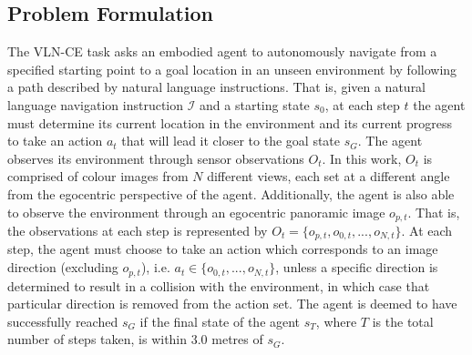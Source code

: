 \documentclass{svproc}
\begin{document}
\subsection{Problem Formulation}
    The VLN-CE task asks an embodied agent to autonomously navigate from a specified starting point to a goal location in an unseen environment by following a path described by natural language instructions. That is, given a natural language navigation instruction $\mathcal{I}$ and a starting state $s_0$, at each step $t$ the agent must determine its current location in the environment and its current progress to take an action $a_t$ that will lead it closer to the goal state $s_G$. The agent observes its environment through sensor observations $O_t$. In this work, $O_t$ is comprised of colour images from $N$ different views, each set at a different angle from the egocentric perspective of the agent. Additionally, the agent is also able to observe the environment through an egocentric panoramic image $o_{p,t}$. That is, the observations at each step is represented by $O_t = \{o_{p,t}, o_{0, t}, ..., o_{N,t}\}$. At each step, the agent must choose to take an action which corresponds to an image direction (excluding $o_{p,t}$), i.e. $a_t \in \{o_{0,t}, ..., o_{N,t}\}$, unless a specific direction is determined to result in a collision with the environment, in which case that particular direction is removed from the action set. The agent is deemed to have successfully reached $s_G$ if the final state of the agent $s_T$, where $T$ is the total number of steps taken, is within 3.0 metres of $s_G$.
\end{document}
